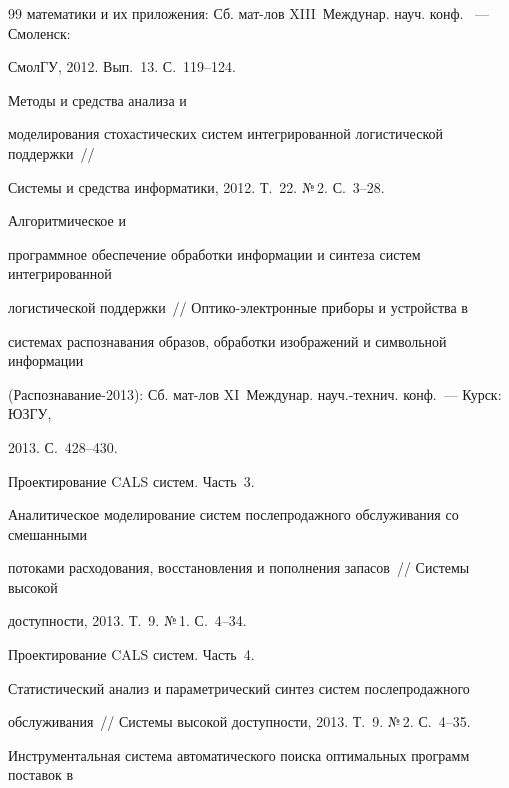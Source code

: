 {{\begin{thebibliography}{99}
математики и их приложения: Сб. мат-лов XIII~Междунар. науч. конф. ~--- Смоленск:

СмолГУ, 2012. Вып.~13. С.~119--124.


 Методы и средства анализа и

моделирования стохастических систем интегрированной логистической поддержки~/\!\!/

Системы и средства информатики, 2012. Т.~22. №\,2. С.~3--28.


 Алгоритмическое и

программное обеспечение обработки информации и синтеза сис\-тем интегрированной

логистической поддержки~/\!\!/ Оп\-ти\-ко-элек\-трон\-ные приборы и устройства в

сис\-те\-мах распознавания образов, обработки изображений и символьной информации

(Распознавание-2013): Сб. мат-лов XI~Междунар. науч.-технич. конф.~--- Курск: ЮЗГУ,

2013. С.~428--430.


 Проектирование CALS сис\-тем. Часть~3.

Аналитическое моделирование сис\-тем послепродажного обслуживания со смешанными

потоками расходования, восстановления и пополнения запасов~/\!\!/ Сис\-те\-мы высокой

доступности, 2013. Т.~9. №\,1. С.~4--34.


 Проектирование CALS сис\-тем. Часть~4.

Статистический анализ и параметрический синтез сис\-тем послепродажного

обслуживания~/\!\!/ Сис\-те\-мы высокой доступности, 2013. Т.~9. №\,2. С.~4--35.



Инструментальная система автоматического поиска оптимальных программ поставок в


\end{thebibliography}}}
